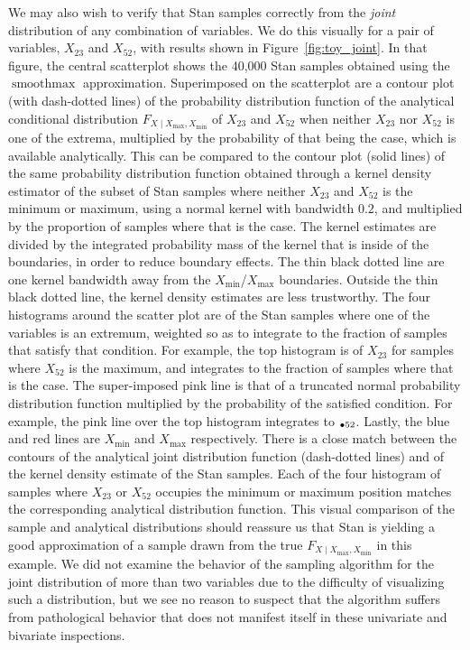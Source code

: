 \documentclass[letter]{article}
\let\Pr\relax
\DeclareMathOperator{\Pr}{\mathbb{P}}
\DeclareMathOperator*{\softmax}{smoothmax}
\newcommand{\Xmax}{X_{\max}}
\newcommand{\Xmin}{X_{\min}}
\newcommand{\Fcond}{F_{X \mid \Xmax,\Xmin}}
\newcommand{\pxx}[2]{\Pr{}_{#1#2}}
\begin{document}
We may also wish to verify that Stan samples correctly from the \emph{joint} distribution of any combination of variables.
We do this visually for a pair of variables, \(X_{23}\) and \(X_{52}\), with results shown in Figure~\ref{fig:toy_joint}.
In that figure, the central scatterplot shows the 40,000 Stan samples obtained using the \(\softmax\) approximation.
Superimposed on the scatterplot are a contour plot (with dash-dotted lines) of the probability distribution function of the analytical conditional distribution \(\Fcond\) of \(X_{23}\) and \(X_{52}\) when neither \(X_{23}\) nor \(X_{52}\) is one of the extrema, multiplied by the probability of that being the case, which is available analytically.
This can be compared to the contour plot (solid lines) of the same probability distribution function obtained through a kernel density estimator of the subset of Stan samples where neither \(X_{23}\) and \(X_{52}\) is the minimum or maximum,
using a normal kernel with bandwidth \(0.2\),
and multiplied by the proportion of samples where that is the case.
The kernel estimates are divided by the integrated probability mass of the kernel that is inside of the boundaries, in order to reduce boundary effects.
The thin black dotted line are one kernel bandwidth away from the \(\Xmin\)/\(\Xmax\) boundaries.
Outside the thin black dotted line, the kernel density estimates are less trustworthy.
The four histograms around the scatter plot are of the Stan samples where one of the variables is an extremum, weighted so as to integrate to the fraction of samples that satisfy that condition.
For example, the top histogram is of \(X_{23}\) for samples where \(X_{52}\) is the maximum,
and integrates to the fraction of samples where that is the case.
The super-imposed pink line is that of a truncated normal probability distribution function
multiplied by the probability of the satisfied condition.
For example, the pink line over the top histogram integrates to \(\pxx{\bullet}{52}\).
Lastly, the blue and red lines are \(\Xmin\) and \(\Xmax\) respectively.
There is a close match between the contours of the analytical joint distribution function (dash-dotted lines) and of the kernel density estimate of the Stan samples.
Each of the four histogram of samples where \(X_{23}\) or \(X_{52}\) occupies the minimum or maximum position matches the corresponding analytical distribution function.
This visual comparison of the sample and analytical distributions should reassure us that Stan is yielding a good approximation of a sample drawn from the true \(\Fcond\) in this example.
We did not examine the behavior of the sampling algorithm for the joint distribution of more than two variables due to the difficulty of visualizing such a distribution,
but we see no reason to suspect that the algorithm suffers from pathological behavior that does not manifest itself in these univariate and bivariate inspections.
    
\end{document}

